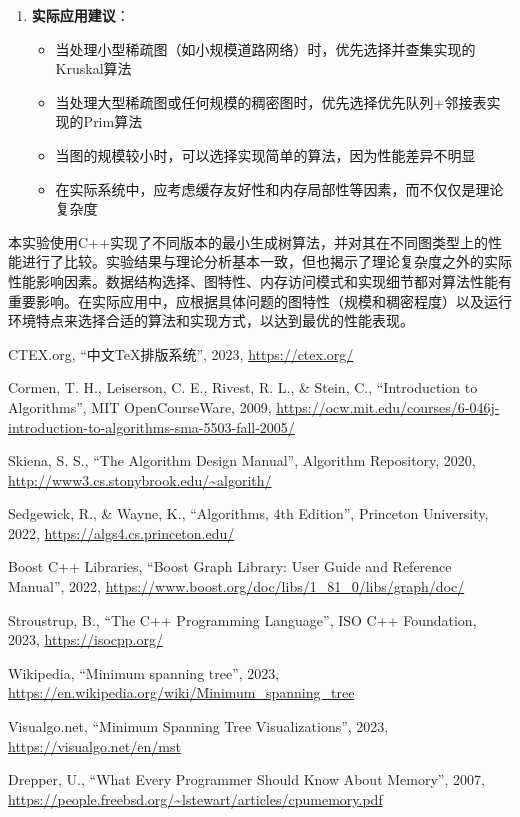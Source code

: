 \documentclass[a4paper,12pt]{ctexart}
\begin{document}
\begin{enumerate}
    \item \textbf{实际应用建议}：
    \begin{itemize}
        \item 当处理小型稀疏图（如小规模道路网络）时，优先选择并查集实现的Kruskal算法
        \item 当处理大型稀疏图或任何规模的稠密图时，优先选择优先队列+邻接表实现的Prim算法
        \item 当图的规模较小时，可以选择实现简单的算法，因为性能差异不明显
        \item 在实际系统中，应考虑缓存友好性和内存局部性等因素，而不仅仅是理论复杂度
    \end{itemize}
\end{enumerate}

本实验使用C++实现了不同版本的最小生成树算法，并对其在不同图类型上的性能进行了比较。实验结果与理论分析基本一致，但也揭示了理论复杂度之外的实际性能影响因素。数据结构选择、图特性、内存访问模式和实现细节都对算法性能有重要影响。在实际应用中，应根据具体问题的图特性（规模和稠密程度）以及运行环境特点来选择合适的算法和实现方式，以达到最优的性能表现。

\begin{thebibliography}{9}
     CTEX.org, ``中文TeX排版系统'', 2023, \url{https://ctex.org/}
    
     Cormen, T. H., Leiserson, C. E., Rivest, R. L., \& Stein, C., ``Introduction to Algorithms'', MIT OpenCourseWare, 2009, \url{https://ocw.mit.edu/courses/6-046j-introduction-to-algorithms-sma-5503-fall-2005/}
    
     Skiena, S. S., ``The Algorithm Design Manual'', Algorithm Repository, 2020, \url{http://www3.cs.stonybrook.edu/~algorith/}
    
     Sedgewick, R., \& Wayne, K., ``Algorithms, 4th Edition'', Princeton University, 2022, \url{https://algs4.cs.princeton.edu/}
    
     Boost C++ Libraries, ``Boost Graph Library: User Guide and Reference Manual'', 2022, \url{https://www.boost.org/doc/libs/1\_81\_0/libs/graph/doc/}
    
     Stroustrup, B., ``The C++ Programming Language'', ISO C++ Foundation, 2023, \url{https://isocpp.org/}
    
     Wikipedia, ``Minimum spanning tree'', 2023, \url{https://en.wikipedia.org/wiki/Minimum\_spanning\_tree}
    
     Visualgo.net, ``Minimum Spanning Tree Visualizations'', 2023, \url{https://visualgo.net/en/mst}
    
     Drepper, U., ``What Every Programmer Should Know About Memory'', 2007, \url{https://people.freebsd.org/~lstewart/articles/cpumemory.pdf}
\end{thebibliography}
\end{document}
